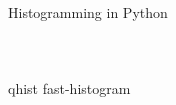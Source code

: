 \documentclass[aspectratio=169]{beamer}
\begin{document}
\begin{frame}{Histogramming in Python}
\begin{columns}
\begin{tabular}{c l c p{2.5 cm} p{1.5 cm} p{4.75 cm}}
\end{tabular}
\end{columns}
qhist
fast-histogram

\end{frame}





\end{document}
